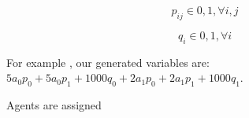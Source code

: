 \documentclass[a4paper,11pt]{article}
\begin{document}
\begin{equation} %
p_{ij} \in {0, 1}, \forall i, j
\end{equation}

\begin{equation}
q_{i} \in {0, 1}, \forall i
\end{equation}

For example \cite{put example!}, our generated variables are: $5a_0p_0 + 5a_0p_1 + 1000q_0 + 2a_1p_0 + 2a_1p_1 + 1000q_1$.

Agents are assigned





	
\end{document}
